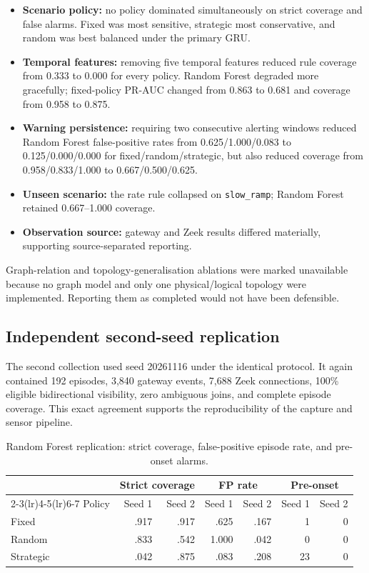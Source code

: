 \documentclass[10pt,a4paper]{article}
\begin{document}
\begin{itemize}
\item \textbf{Scenario policy:} no policy dominated simultaneously on strict coverage and false alarms. Fixed was most sensitive, strategic most conservative, and random was best balanced under the primary GRU.
\item \textbf{Temporal features:} removing five temporal features reduced rule coverage from 0.333 to 0.000 for every policy. Random Forest degraded more gracefully; fixed-policy PR-AUC changed from 0.863 to 0.681 and coverage from 0.958 to 0.875.
\item \textbf{Warning persistence:} requiring two consecutive alerting windows reduced Random Forest false-positive rates from 0.625/1.000/0.083 to 0.125/0.000/0.000 for fixed/random/strategic, but also reduced coverage from 0.958/0.833/1.000 to 0.667/0.500/0.625.
\item \textbf{Unseen scenario:} the rate rule collapsed on \texttt{slow\_ramp}; Random Forest retained 0.667--1.000 coverage.
\item \textbf{Observation source:} gateway and Zeek results differed materially, supporting source-separated reporting.
\end{itemize}

Graph-relation and topology-generalisation ablations were marked unavailable because no graph model and only one physical/logical topology were implemented. Reporting them as completed would not have been defensible.

\subsection{Independent second-seed replication}

The second collection used seed 20261116 under the identical protocol. It again contained 192 episodes, 3,840 gateway events, 7,688 Zeek connections, 100\% eligible bidirectional visibility, zero ambiguous joins, and complete episode coverage. This exact agreement supports the reproducibility of the capture and sensor pipeline.

\begin{table}[H]
\centering
\caption{Random Forest replication: strict coverage, false-positive episode rate, and pre-onset alarms.}
\small
\begin{tabular}{@{}lrrrrrr@{}}
\toprule
& \multicolumn{2}{c}{Strict coverage} & \multicolumn{2}{c}{FP rate} & \multicolumn{2}{c}{Pre-onset} \\
\cmidrule(lr){2-3}\cmidrule(lr){4-5}\cmidrule(lr){6-7}
Policy & Seed 1 & Seed 2 & Seed 1 & Seed 2 & Seed 1 & Seed 2 \\
\midrule
Fixed & .917 & .917 & .625 & .167 & 1 & 0 \\
Random & .833 & .542 & 1.000 & .042 & 0 & 0 \\
Strategic & .042 & .875 & .083 & .208 & 23 & 0 \\
\bottomrule
\end{tabular}
\end{table}
\end{document}
